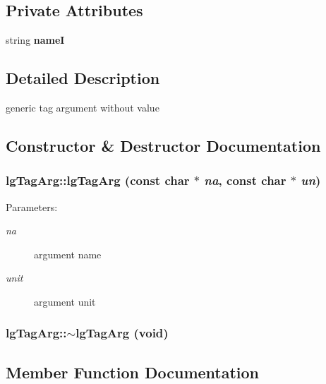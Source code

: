 \subsection*{Private Attributes}
\begin{CompactItemize}
\item 
string {\bf name\-I}
\end{CompactItemize}


\subsection{Detailed Description}
generic tag argument without value 



\subsection{Constructor \& Destructor Documentation}
\subsubsection{\setlength{\rightskip}{0pt plus 5cm}lg\-Tag\-Arg::lg\-Tag\-Arg (const char $\ast$ {\em na}, const char $\ast$ {\em un})}\label{classlgTagArg_a1}


\begin{Desc}
\item[Parameters: ]\par
\begin{description}
\item[{\em 
na}]argument name \item[{\em 
unit}]argument unit \end{description}
\end{Desc}
\subsubsection{\setlength{\rightskip}{0pt plus 5cm}lg\-Tag\-Arg::$\sim${\bf lg\-Tag\-Arg} (void)\hspace{0.3cm}{\tt  [virtual]}}\label{classlgTagArg_a2}




\subsection{Member Function Documentation}

